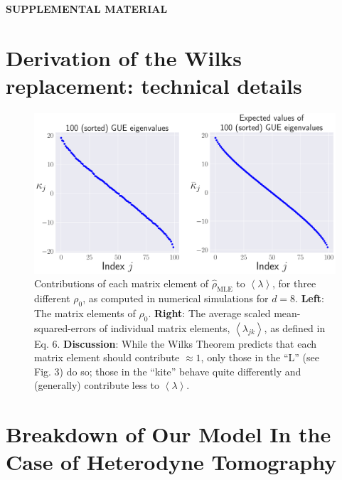 \documentclass[aps,pra, twocolumn]{revtex4}
\newcommand{\expect}[1]{\ensuremath{\left\langle#1\right\rangle}}
\newcommand{\rhohat}{\hat{\rho}}
\newcommand{\rhoMLE}{\rhohat_{\scriptscriptstyle\mathrm{MLE}}}
\begin{document}
\newpage
\newpage

\begin{center}\textbf{SUPPLEMENTAL MATERIAL}\end{center}

\section{Derivation of the Wilks replacement: technical details}
\label{app:technical}

\begin{figure}[h!]
\includegraphics[width=\columnwidth]{Images/Figure_7.pdf}
 \caption{Contributions of each matrix element of $\rhoMLE$ to $\expect{\lambda}$, for three different $\rho_0$, as computed in numerical simulations for $d=8$.  \textbf{Left}:  The matrix elements of $\rho_0$.  \textbf{Right}:  The average scaled mean-squared-errors of individual matrix elements, $\expect{\lambda_{jk}}$, as defined in Eq. 6.  \textbf{Discussion}:  While the Wilks Theorem predicts that each matrix element should contribute $\approx1$, only those in the ``L'' (see Fig. 3) do so; those in the ``kite'' behave quite differently and (generally) contribute less to $\expect{\lambda}$.
}
\label{fig:isocontribs}
\end{figure}



\section{Breakdown of Our Model In the Case of Heterodyne Tomography}
\label{app:breakdown}
\end{document}
